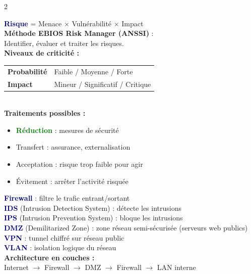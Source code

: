 \documentclass[a4paper,10pt]{article}
\newcommand{\key}[1]{\textbf{\textcolor{navy}{#1}}}
\newcommand{\ok}[1]{\textbf{\textcolor{green}{#1}}}
\begin{document}
\begin{multicols}{2}
\begin{tcolorbox}[basebox, colframe=navy, title=7. Analyse des risques]
\key{Risque} = Menace $\times$ Vulnérabilité $\times$ Impact\\[4pt]
\textbf{Méthode EBIOS Risk Manager (ANSSI)} :\\
Identifier, évaluer et traiter les risques.\\[4pt]
\textbf{Niveaux de criticité :}
\begin{tabular}{ll}
\textbf{Probabilité} & Faible / Moyenne / Forte \\
\textbf{Impact} & Mineur / Significatif / Critique \\
\end{tabular}
\vspace{4pt}\\
\textbf{Traitements possibles :}
\begin{itemize}
  \item \ok{Réduction} : mesures de sécurité
  \item Transfert : assurance, externalisation
  \item Acceptation : risque trop faible pour agir
  \item Évitement : arrêter l'activité risquée
\end{itemize}
\end{tcolorbox}

\begin{tcolorbox}[basebox, colframe=teal, title=8. Sécurité des réseaux]
\key{Firewall} : filtre le trafic entrant/sortant \\
\key{IDS} (Intrusion Detection System) : détecte les intrusions \\
\key{IPS} (Intrusion Prevention System) : bloque les intrusions \\
\key{DMZ} (Demilitarized Zone) : zone réseau semi-sécurisée (serveurs web publics) \\
\key{VPN} : tunnel chiffré sur réseau public \\
\key{VLAN} : isolation logique du réseau \\[4pt]
\textbf{Architecture en couches :}\\
Internet $\to$ Firewall $\to$ DMZ $\to$ Firewall $\to$ LAN interne
\end{tcolorbox}


\end{multicols}
\end{document}
